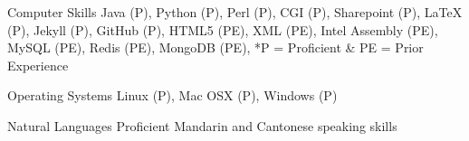 


\begin{cvskills}


\cvskill
{Computer Skills} %
{Java (P), Python (P), Perl (P), CGI (P), Sharepoint (P), LaTeX (P), Jekyll (P), GitHub (P), HTML5 (PE), XML (PE), Intel Assembly (PE), MySQL (PE), Redis (PE), MongoDB (PE), *P = Proficient \& PE = Prior Experience} %




\cvskill
{Operating Systems} %
{Linux (P), Mac OSX (P), Windows (P)} %


\cvskill
{Natural Languages} %
{Proficient Mandarin and Cantonese speaking skills} %


\end{cvskills}